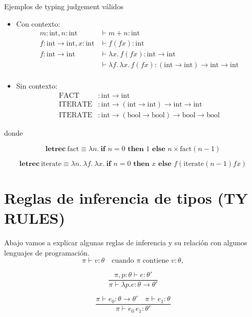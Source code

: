 \documentclass[runningheads]{llncs}
\begin{document}
Ejemplos de typing judgement válidos
\begin{itemize}
  \item Con contexto:
\begin{align*}
m: \text{int}, n: \text{int} &\vdash m + n : \text{int} \\
f: \text{int} \to \text{int}, x: \text{int} &\vdash f(fx) : \text{int} \\
f: \text{int} \to \text{int} &\vdash \lambda x.\, f(fx) : \text{int} \to \text{int} \\
&\vdash \lambda f.\, \lambda x.\, f(fx) : (\text{int} \to \text{int}) \to \text{int} \to \text{int} \\
\end{align*}
  \item Sin contexto:
\begin{align*}
\text{FACT} & : \text{int} \to \text{int} \\
\text{ITERATE} & : \text{int} \to (\text{int} \to \text{int}) \to \text{int} \to \text{int} \\
\text{ITERATE} & : \text{int} \to (\text{bool} \to \text{bool}) \to \text{bool} \to \text{bool}
\end{align*}
\end{itemize}

donde 

$$\textbf{letrec}\ \text{fact} \equiv \lambda n.\ \textbf{if } n = 0 \textbf{ then } 1 \textbf{ else } n \times \text{fact}(n - 1)$$

$$\textbf{letrec}\ \text{iterate} \equiv \lambda n.\ \lambda f.\ \lambda x.\ \textbf{if } n = 0 \textbf{ then } x \textbf{ else } f(\text{iterate}(n - 1) f x)$$

\section{Reglas de inferencia de tipos (TY RULES)}

Abajo vamos a explicar algunas reglas de inferencia y su relación con algunos lenguajes de programación.
$$\;$$
\[
\pi \vdash v : \theta \quad \text{cuando } \pi \text{ contiene } v : \theta, \tag{15.3}
\]

\[
\frac{\pi, p : \theta \vdash e : \theta'}{\pi \vdash \lambda p. e : \theta \to \theta'} \tag{15.4}
\]

\[
\frac{\pi \vdash e_0 : \theta \to \theta' \quad \pi \vdash e_1 : \theta}{\pi \vdash e_0 \, e_1 : \theta'} \tag{15.5}
\]
\end{document}
